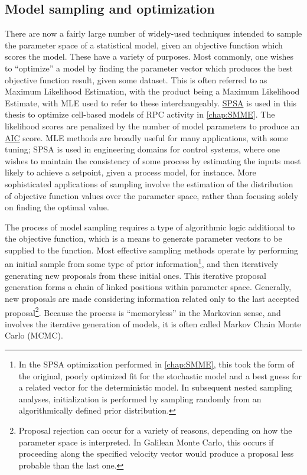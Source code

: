 \subsection{Model sampling and optimization}
\label{sampleoptim}
There are now a fairly large number of widely-used techniques intended to sample the parameter space of a statistical model, given an objective function which scores the model. These have a variety of purposes. Most commonly, one wishes to ``optimize'' a model by finding the parameter vector which produces the best objective function result, given some dataset. This is often referred to as Maximum Likelihood Estimation, with the product being a Maximum Likelihood Estimate, with MLE used to refer to these interchangeably. \hyperref[SPSA]{SPSA} is used in this thesis to optimize cell-based models of RPC activity in \autoref{chap:SMME}. The likelihood scores are penalized by the number of model parameters to produce an \hyperref[AIC]{AIC} score. MLE methods are broadly useful for many applications, with some tuning; SPSA is used in engineering domains for control systems, where one wishes to maintain the consistency of some process by estimating the inputs most likely to achieve a setpoint, given a process model, for instance. More sophisticated applications of sampling involve the estimation of the distribution of objective function values over the parameter space, rather than focusing solely on finding the optimal value.

The process of model sampling requires a type of algorithmic logic additional to the objective function, which is a means to generate parameter vectors to be supplied to the function. Most effective sampling methods operate by performing an initial sample from some type of prior information\footnote{In the SPSA optimization performed in \autoref{chap:SMME}, this took the form of the original, poorly optimized fit for the stochastic model and a best guess for a related vector for the deterministic model. In subsequent nested sampling analyses, initialization is performed by sampling randomly from an algorithmically defined prior distribution.}, and then iteratively generating new proposals from these initial ones. This iterative proposal generation forms a chain of linked positions within parameter space. Generally, new proposals are made considering information related only to the last accepted proposal\footnote{Proposal rejection can occur for a variety of reasons, depending on how the parameter space is interpreted. In Galilean Monte Carlo, this occurs if proceeding along the specified velocity vector would produce a proposal less probable than the last one.}. Because the process is ``memoryless'' in the Markovian sense, and involves the iterative generation of models, it is often called Markov Chain Monte Carlo (MCMC).

